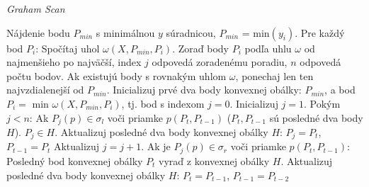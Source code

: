\documentclass[11pt]{article}
\begin{document}
\begin{algorithm}
    \caption {\textit{Graham Scan}}
    \begin{algorithmic}[1]
        \State Nájdenie bodu $P_{min}$ s minimálnou $y$ súradnicou, $P_{min}$ = min$(y_i)$.
        \State Pre každý bod $P_i$:
        \State \indent Spočítaj uhol $\omega(X, P_{min}, P_i)$.
        \State Zoraď body $P_i$ podľa uhlu $\omega$ od najmenšieho po najväčší, index $j$ odpovedá zoradenému poradiu, $n$ odpovedá počtu bodov.
        \State Ak existujú body s rovnakým uhlom $\omega$, ponechaj len ten najvzdialenejší od $P_{min}$.
        \State Inicializuj prvé dva body konvexnej obálky: $P_{min}$, a bod $P_i =$ min $\omega(X, P_{min}, P_i)$, tj. bod s indexom $j = 0$.
        \State Inicializuj $j = 1$.
        \State Pokým $j < n$:
        \State \indent Ak $P_j(p) \in \sigma_l$ voči priamke $p(P_t, P_{t-1})$ ($P_t, P_{t-1}$ sú posledné dva body $H$).
        \State \indent \indent $P_j \in H$.
        \State \indent \indent Aktualizuj posledné dva body konvexnej obálky $H$: $P_j = P_t$, $P_{t-1} = P_t$
        \State \indent \indent Aktualizuj $j = j + 1$.
        \State \indent Ak je $P_j(p) \in \sigma_r$ voči priamke $p(P_t, P_{t-1})$:
        \State \indent \indent Posledný bod konvexnej obálky $P_t$ vyraď z konvexnej obálky $H$.
        \State \indent \indent Aktualizuj posledné dva body konvexnej obálky $H$: $P_t = P_{t-1}$, $P_{t-1} = P_{t-2}$
    \end{algorithmic}
\end{algorithm}
\end{document}
